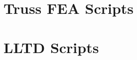 \documentclass[a4paper]{article}
\numberwithin{equation}{section}
\begin{document}
\begin{appendices}
	\section{Truss FEA Scripts} \label{FEA Scripts}
	
	\section{LLTD Scripts} \label{LLTD Scripts}
\end{appendices}
\end{document}
